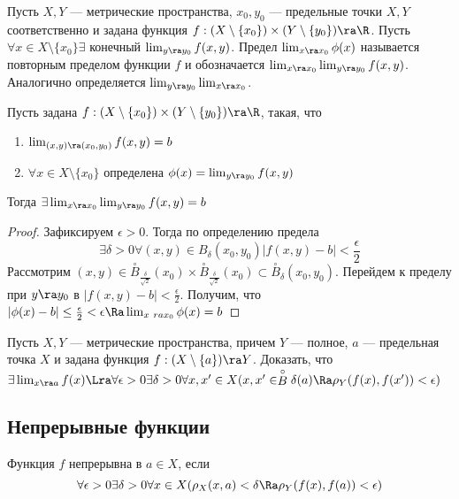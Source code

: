 
\begin{definition}
    Пусть \(X, Y\) --- метрические пространства, \(x_0, y_0\) --- предельные точки \(X, Y\) соответственно и задана функция \(f: (X \setminus \{x_0\})\times(Y \setminus \{y_0\}) \ra \R\). Пусть \(\forall x \in X \setminus \{x_0\} \exists \) конечный \(\lim_{y \ra y_0} f(x, y)\). Предел \(\lim_{x \ra x_0}\phi(x)\) называется повторным пределом функции \(f\) и обозначается \(\lim_{x \ra x_0}\lim_{y \ra y_0} f(x, y)\). Аналогично определяется \(\lim_{y \ra y_0}\lim_{x \ra x_0}\).
\end{definition}

\begin{lemma}
    Пусть задана \(f: (X \setminus \{x_0\})\times(Y \setminus \{y_0\}) \ra \R\), такая, что
    \begin{enumerate}
        \item \(\lim_{(x, y) \ra (x_0, y_0)}f(x, y) = b\)
        \item \(\forall x \in X \setminus \{x_0\}\) определена \(\phi(x) = \lim_{y \ra y_0} f(x, y)\)
    \end{enumerate}
    Тогда \(\exists \lim_{x \ra x_0}\lim_{y \ra y_0}f(x, y) = b\)
\end{lemma}
\begin{proof}
    Зафиксируем \(\epsilon > 0\). Тогда по определению предела
    \[\exists \delta > 0 \forall (x, y) \in B_\delta(x_0, y_0) |f(x, y) - b| < \frac{\epsilon}{2}\]
    Рассмотрим \((x, y) \in \stackrel{\circ}{B}_\frac{\delta}{\sqrt{2}}(x_0)\times \stackrel{\circ}{B}_\frac{\delta}{\sqrt{2}}(x_0) \subset \stackrel{\circ}{B}_\delta(x_0, y_0)\). Перейдем к пределу при \(y \ra y_0\) в \(|f(x, y) - b| < \frac{\epsilon}{2}\). Получим, что \(|\phi(x) - b| \le \frac{\epsilon}{2} < \epsilon \Ra \lim_{x\ ra x_0} \phi(x) = b\)
\end{proof}

\begin{theorem}
    Пусть \(X, Y\) --- метрические пространства, причем \(Y\) --- полное, \(a\) --- предельная точка \(X\) и задана функция \(f: (X \setminus \{a\}) \ra Y\). Доказать, что \(\exists \lim_{x \ra a} f(x) \Lra \forall \epsilon > 0 \exists \delta > 0 \forall x, x' \in X (x, x' \in \stackrel{\circ}{B}\delta(a) \Ra \rho_Y(f(x), f(x')) < \epsilon)\)
\end{theorem}

\subsection{Непрерывные функции}
\begin{definition}
    Функция \(f\) непрерывна в \(a \in X\), если 
    \[\forall \epsilon > 0 \exists \delta > 0 \forall x \in X (\rho_X(x, a) < \delta \Ra \rho_Y(f(x), f(a)) < \epsilon)\]
\end{definition}

